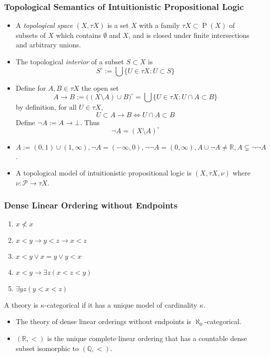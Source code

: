 \documentclass[UTF8,aspectratio=43,11pt,colorlinks,compress,openany]{beamer}%
\begin{document}
\begin{frame}\frametitle{Topological Semantics of Intuitionistic Propositional Logic}
\begin{itemize}
	\item A \emph{topological space} $(X,\tau X)$ is a set $X$ with a family $\tau X\subset\operatorname{P}(X)$ of subsets of $X$ which contains $\emptyset$ and $X$, and is closed under finite intersections and arbitrary unions.
	\item The topological \emph{interior} of a subset $S\subset X$ is
	\[S^\circ:=\bigcup\big\{U\in\tau X: U\subset S\big\}\]
	\item Define for $A,B\in\tau X$ the open set
	\[A\to B :=\big((X\setminus A)\cup B\big)^\circ=\bigcup\big\{U\in\tau X:U\cap A\subset B\big\}\]
	by definition, for all $U\in\tau X$,
	\[U\subset A\to B\iff U\cap A\subset B\]
	Define $\neg A:=A\to\bot$. Thus
	\[\neg A=(X\setminus A)^\circ\]
	\item $A:=(0,1)\cup(1,\infty), \neg A=(-\infty,0), \neg\neg A=(0,\infty), A\cup\neg A\ne\mathbb{R}, A\subsetneq\neg\neg A$.
	\item A topological model of intuitionistic propositional logic is $(X,\tau X,\nu)$ where $\nu:\mathcal{P}\to\tau X$.
\end{itemize}
\end{frame}

\begin{frame}\frametitle{Dense Linear Ordering without Endpoints}
	\begin{enumerate}
		\item $x\nless x$
		\item $x<y\to y<z\to x<z$
		\item $x<y\vee x=y\vee y<x$
		\item $x<y\to\exists z(x<z<y)$
		\item $\exists yz(y<x<z)$
	\end{enumerate}
	\begin{definition}
	A theory is $\kappa$-categorical if it has a unique model of cardinality $\kappa$.
	\end{definition}
	\begin{theorem}[Cantor]
		\begin{itemize}
			\item The theory of dense linear orderings without endpoints is $\aleph_0$-categorical.
			\item $(\mathbb{R},<)$ is the unique complete linear ordering that has a countable dense subset isomorphic to $(\mathbb{Q},<)$.
		\end{itemize}
	\end{theorem}
\end{frame}
\end{document}
